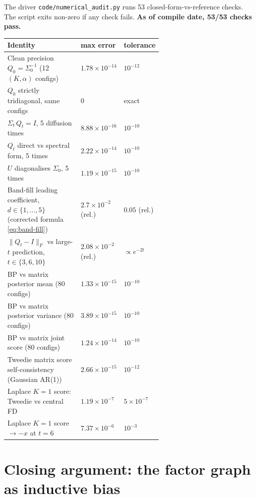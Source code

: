 \documentclass[11pt]{article}
\theoremstyle{definition}
\newcommand{\Sig}{\Sigma}
\begin{document}
The driver \texttt{code/numerical\_audit.py} runs 53 closed-form-vs-reference
checks. The script exits non-zero if any check fails.
\textbf{As of compile date, 53/53 checks pass.}

\begin{auditbox}
\begin{tabular}{@{}p{0.62\linewidth} l l@{}}
\hline
Identity & max error & tolerance \\
\hline
Clean precision \(Q_0 = \Sig_0^{-1}\) (12 \((K, \alpha)\) configs)
    & \(1.78 \times 10^{-14}\) & \(10^{-12}\) \\
\(Q_0\) strictly tridiagonal, same configs
    & \(0\) & exact \\
\(\Sig_t\, Q_t = I\), 5 diffusion times
    & \(8.88 \times 10^{-16}\) & \(10^{-10}\) \\
\(Q_t\) direct vs spectral form, 5 times
    & \(2.22 \times 10^{-14}\) & \(10^{-10}\) \\
\(U\) diagonalises \(\Sig_0\), 5 times
    & \(1.19 \times 10^{-15}\) & \(10^{-10}\) \\
Band-fill leading coefficient, \(d \in \{1, \dots, 5\}\)
    (corrected formula \eqref{eq:band-fill})
    & \(2.7 \times 10^{-2}\) (rel.) & \(0.05\) (rel.) \\
\(\|Q_t - I\|_F\) vs large-\(t\) prediction, \(t \in \{3, 6, 10\}\)
    & \(2.08 \times 10^{-2}\) (rel.) & \(\propto e^{-2 t}\) \\
BP vs matrix posterior mean (80 configs)
    & \(1.33 \times 10^{-15}\) & \(10^{-10}\) \\
BP vs matrix posterior variance (80 configs)
    & \(3.89 \times 10^{-15}\) & \(10^{-10}\) \\
BP vs matrix joint score (80 configs)
    & \(1.24 \times 10^{-14}\) & \(10^{-10}\) \\
Tweedie matrix score self-consistency (Gaussian AR(1))
    & \(2.66 \times 10^{-15}\) & \(10^{-12}\) \\
Laplace \(K = 1\) score: Tweedie vs central FD
    & \(1.19 \times 10^{-7}\) & \(5 \times 10^{-7}\) \\
Laplace \(K = 1\) score \(\to -x\) at \(t = 6\)
    & \(7.37 \times 10^{-6}\) & \(10^{-3}\) \\
\hline
\end{tabular}
\end{auditbox}

\section{Closing argument: the factor graph as inductive bias}\label{sec:inductive-bias}
\end{document}
